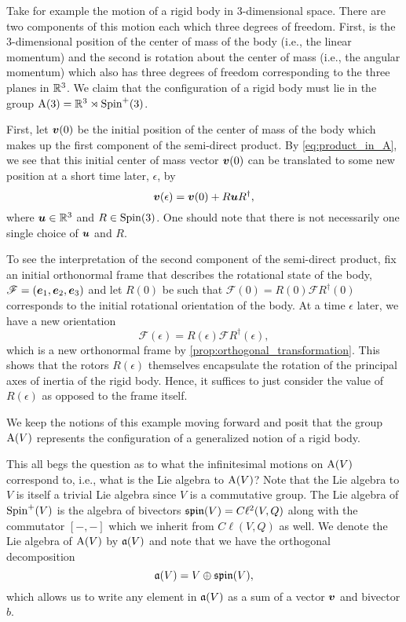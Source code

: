 \documentclass[conf]{new-aiaa}
\begin{document}
\begin{example}
Take for example the motion of a rigid body in 3-dimensional space. There are two components of this motion each which three degrees of freedom. First, is the 3-dimensional position of the center of mass of the body (i.e., the linear momentum) and the second is rotation about the center of mass (i.e., the angular momentum) which also has three degrees of freedom corresponding to the three planes in $\mathbb{R}^3$. We claim that the configuration of a rigid body must lie in the group $\operatorname{A}(3)=\mathbb{R}^3 \rtimes \operatorname{Spin}^+(3)$. 

First, let $\boldsymbol{v}(0)$ be the initial position of the center of mass of the body which makes up the first component of the semi-direct product. By \cref{eq:product_in_A}, we see that this initial center of mass vector $\boldsymbol{v}(0)$ can be translated to some new position at a short time later, $\epsilon$, by 
\begin{equation}
\boldsymbol{v}(\epsilon) = \boldsymbol{v}(0)+R\boldsymbol{u} R^\dagger,
\end{equation}
where $\boldsymbol{u}\in \mathbb{R}^3$ and $R\in \operatorname{Spin}(3)$. One should note that there is not necessarily one single choice of $\boldsymbol{u}$ and $R$.

To see the interpretation of the second component of the semi-direct product, fix an initial orthonormal frame that describes the rotational state of the body, $\mathscr{F}=(\boldsymbol{e}_1,\boldsymbol{e}_2,\boldsymbol{e}_3)$ and let $R(0)$ be such that $\mathscr{F}(0)=R(0)\mathscr{F}R^\dagger(0)$ corresponds to the initial rotational orientation of the body. At a time $\epsilon$ later, we have a new orientation
\begin{equation}
\mathscr{F}(\epsilon) = R(\epsilon) \mathscr{F} R^\dagger(\epsilon),
\end{equation}
which is a new orthonormal frame by \cref{prop:orthogonal_transformation}. This shows that the rotors $R(\epsilon)$ themselves encapsulate the rotation of the principal axes of inertia of the rigid body. Hence, it suffices to just consider the value of $R(\epsilon)$ as opposed to the frame itself.
\end{example}
We keep the notions of this example moving forward and posit that the group $\operatorname{A}(V)$ represents the configuration of a generalized notion of a rigid body.

This all begs the question as to what the infinitesimal motions on $\operatorname{A}(V)$ correspond to, i.e., what is the Lie algebra to $\operatorname{A}(V)$? Note that the Lie algebra to $V$ is itself a trivial Lie algebra since $V$ is a commutative group. The Lie algebra of $\operatorname{Spin}^+(V)$ is the algebra of bivectors $\mathfrak{spin}(V)=C\ell^2(V,Q)$ along with the commutator $[-,-]$ which we inherit from $C\ell(V,Q)$ as well. We denote the Lie algebra of $\operatorname{A}(V)$ by $\mathfrak{a}(V)$ and note that we have the orthogonal decomposition
\begin{equation}
\mathfrak{a}(V)=V\oplus \mathfrak{spin}(V),
\end{equation}
which allows us to write any element in $\mathfrak{a}(V)$ as a sum of a vector $\boldsymbol{v}$ and bivector $b$. 
\end{document}
